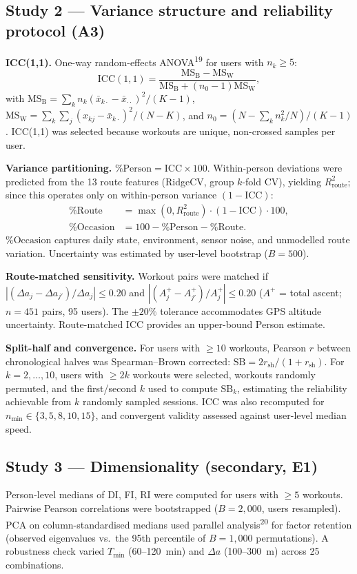 \documentclass[12pt]{article}
\begin{document}
\subsection{Study 2 --- Variance structure and reliability protocol (A3)}
\textbf{ICC(1,1).} One-way random-effects ANOVA\textsuperscript{19} for
users with $n_k\geq5$:
\begin{equation}
  \mathrm{ICC}(1,1)=\frac{\mathrm{MS_B}-\mathrm{MS_W}}
                        {\mathrm{MS_B}+(n_0-1)\mathrm{MS_W}},
  \label{eq:icc}
\end{equation}
with $\mathrm{MS_B}=\sum_k n_k(\bar x_{k\cdot}-\bar x_{\cdot\cdot})^2/(K-1)$,
$\mathrm{MS_W}=\sum_k\sum_j(x_{kj}-\bar x_{k\cdot})^2/(N-K)$, and
$n_0=(N-\sum_k n_k^2/N)/(K-1)$. ICC(1,1) was selected because workouts are
unique, non-crossed samples per user.

\textbf{Variance partitioning.} $\%\mathrm{Person}=\mathrm{ICC}\times100$.
Within-person deviations were predicted from the 13 route features
(RidgeCV, group $k$-fold CV), yielding $R^2_{\mathrm{route}}$; since this
operates only on within-person variance $(1-\mathrm{ICC})$:
\begin{align*}
  \%\mathrm{Route}&=\max(0,R^2_{\mathrm{route}})\cdot(1-\mathrm{ICC})\cdot100,\\
  \%\mathrm{Occasion}&=100-\%\mathrm{Person}-\%\mathrm{Route}.
\end{align*}
$\%\mathrm{Occasion}$ captures daily state, environment, sensor noise, and
unmodelled route variation. Uncertainty was estimated by user-level
bootstrap ($B=500$).

\textbf{Route-matched sensitivity.} Workout pairs were matched if
$|(\Delta a_j-\Delta a_{j'})/\Delta a_j|\leq0.20$ and
$|(A^+_j-A^+_{j'})/A^+_j|\leq0.20$ ($A^+$ = total ascent; $n=451$ pairs,
95 users). The $\pm20\%$ tolerance accommodates GPS altitude uncertainty.
Route-matched ICC provides an upper-bound Person estimate.

\textbf{Split-half and convergence.} For users with $\geq 10$ workouts,
Pearson $r$ between chronological halves was Spearman--Brown corrected:
$\mathrm{SB}=2r_{\mathrm{sh}}/(1+r_{\mathrm{sh}})$. For $k=2,\dots,10$,
users with $\geq 2k$ workouts were selected, workouts randomly permuted,
and the first/second $k$ used to compute $\mathrm{SB}_k$, estimating the
reliability achievable from $k$ randomly sampled sessions. ICC was also
recomputed for $n_{\min}\in\{3,5,8,10,15\}$, and convergent validity
assessed against user-level median speed.

\subsection{Study 3 --- Dimensionality (secondary, E1)}
Person-level medians of DI, FI, RI were computed for users with $\geq 5$
workouts. Pairwise Pearson correlations were bootstrapped ($B=2{,}000$,
users resampled). PCA on column-standardised medians used parallel
analysis\textsuperscript{20} for factor retention (observed eigenvalues
vs.\ the 95th percentile of $B=1{,}000$ permutations). A robustness check
varied $T_{\min}$ (60--120~min) and $\Delta a$ (100--300~m) across 25
combinations.
\end{document}
